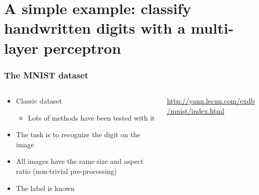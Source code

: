 \section{A simple example: classify handwritten digits with a multi-layer
  perceptron}

\begin{frame}
  \frametitle{The MNIST dataset}
  \begin{columns}
    \begin{column}{0.5\textwidth}
      \begin{itemize}
      \item Classic dataset
        \begin{itemize}
        \item Lots of methods have been tested with it
        \end{itemize}
      \item The task is to recognize the digit on the image
      \item All images have the same size and aspect ratio (non-trivial
        pre-processing)
      \item The label is known
      \end{itemize}
    \end{column}
    \begin{column}{0.5\textwidth}
      \url{http://yann.lecun.com/exdb/mnist/index.html}
    \end{column}
  \end{columns}
\end{frame}


